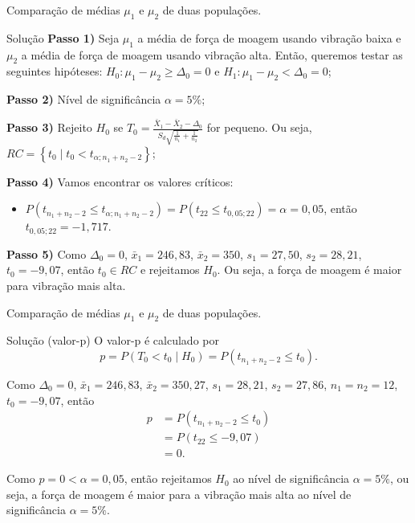 \documentclass[9pt]{beamer}
\begin{document}
\begin{frame}{Comparação de médias $\mu_1$ e $\mu_2$ de duas populações.}


\begin{block}{Solução}
	\textbf{Passo 1)} Seja $\mu_1$ a média de força de moagem usando vibração baixa e $\mu_2$ a média de força de moagem usando vibração alta. Então, queremos testar as seguintes hipóteses: $H_0: \mu_1 - \mu_2 \geq \Delta_0 = 0$ e $H_1: \mu_1 - \mu_2 < \Delta_0=0$;
	
	\textbf{Passo 2)} Nível de significância $\alpha=5\%$;
	
	\textbf{Passo 3)} Rejeito $H_0$ se $T_0 = \frac{\bar{X}_1 - \bar{X}_2 - \Delta_0}{S_d\sqrt{\frac{1}{n_1} + \frac{1}{n_2}}}$ for pequeno. Ou seja, $RC=\left\{ t_0 \mid t_0 < t_{\alpha;n_1+n_2-2} \right\}$;
	
	\textbf{Passo 4)} Vamos encontrar os valores críticos:
	\begin{itemize}
		\item $P(t_{n_1+n_2-2} \leq t_{\alpha; n_1+n_2-2}) = P(t_{22} \leq t_{0,05; 22}) = \alpha = 0,05$, então $t_{0,05; 22} = - 1,717$.
	\end{itemize}

	\textbf{Passo 5)} Como $\Delta_0 = 0$, $\bar{x}_1 = 246,83$, $\bar{x}_2 = 350$, $s_1 = 27,50$, $s_2 = 28, 21$, $t_0 = -9,07$, então $t_0 \in RC$ e rejeitamos $H_0$. Ou seja, a força de moagem é maior para vibração mais alta.
\end{block}


\end{frame}

\begin{frame}{Comparação de médias $\mu_1$ e $\mu_2$ de duas populações.}

\begin{block}{Solução (valor-p)}
	O valor-p é calculado por
	$$p = P(T_0 < t_0 \mid H_0) = P(t_{n_1+n_2-2} \leq t_0).$$
	
	 Como $\Delta_0 = 0$, $\bar{x}_1 = 246,83$, $\bar{x}_2 = 350,27$, $s_1 = 28,21$, $s_2 = 27,86$, $n_1=n_2=12$, $t_0 = -9,07$, então
	 \begin{align*}
		 p &= P (t_{n_1+n_2-2} \leq t_0)\\
		 &= P(t_{22} \leq -9,07)\\
		 &= 0.	 
	 \end{align*}
	 
	 Como $p=0 < \alpha = 0,05$, então rejeitamos $H_0$ ao nível de significância $\alpha=5\%$, ou seja, a força de moagem é maior para a vibração mais alta ao nível de significância $\alpha=5\%$.
\end{block}

\end{frame}
\end{document}
